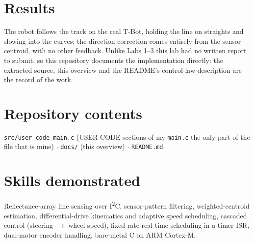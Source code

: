 \documentclass[10pt,a4paper]{article}
\begin{document}
\section*{Results}
The robot follows the track on the real T-Bot, holding the line on straights and slowing into the curves; the
direction correction comes entirely from the sensor centroid, with no other feedback. Unlike Labs 1--3 this lab had
no written report to submit, so this repository documents the implementation directly: the extracted source, this
overview and the README's control-law description are the record of the work.

\section*{Repository contents}
\texttt{src/user\_code\_main.c} (USER CODE sections of my \texttt{main.c} \textendash{} the only part of the file
that is mine) $\cdot$ \texttt{docs/} (this overview) $\cdot$ \texttt{README.md}.

\section*{Skills demonstrated}
Reflectance-array line sensing over I\textsuperscript{2}C, sensor-pattern filtering, weighted-centroid estimation,
differential-drive kinematics and adaptive speed scheduling, cascaded control (steering $\rightarrow$ wheel speed),
fixed-rate real-time scheduling in a timer ISR, dual-motor encoder handling, bare-metal C on ARM Cortex-M.
\end{document}
